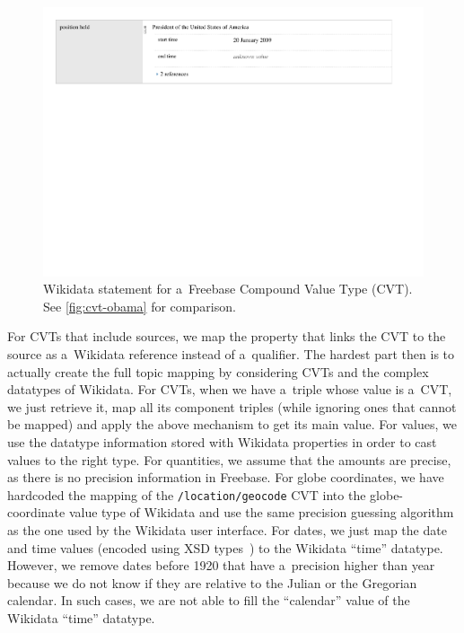 \documentclass{acm_proc_article-sp}
\begin{document}
\begin{figure}[!htbp]
  \centering
  \includegraphics[width=1\columnwidth]{img/wikidata-statement-obama.pdf}
  \caption{Wikidata statement for a~Freebase Compound Value Type (CVT).
    See \autoref{fig:cvt-obama} for comparison.}
  \label{fig:statement-obama}
\end{figure}

For CVTs that include sources, we map the property that links the CVT
to the source as a~Wikidata reference instead of a~qualifier.
The hardest part then is to actually create the full topic mapping
by considering CVTs and the complex datatypes of Wikidata.
For CVTs, when we have a~triple whose value is a~CVT, we just retrieve it,
map all its component triples (while ignoring ones that cannot be mapped)
and apply the above mechanism to get its main value.
For values, we use the datatype information stored with Wikidata properties
in order to cast values to the right type.
For quantities, we assume that the amounts are precise,
as there is no precision information in Freebase.
For globe coordinates, we have hardcoded the mapping of the \texttt{/location/geocode} CVT
into the globe-coordinate value type of Wikidata
and use the same precision guessing algorithm as the one used by the Wikidata user interface.
For dates, we just map the date and time values
(encoded using XSD types~\cite{campbell2003xmlschema})
to the Wikidata ``time'' datatype. However, we remove dates before 1920 that have
a~precision higher than year because we do not know
if they are relative to the Julian or the Gregorian calendar.
In such cases, we are not able to fill the ``calendar'' value of the Wikidata ``time'' datatype.
\end{document}
